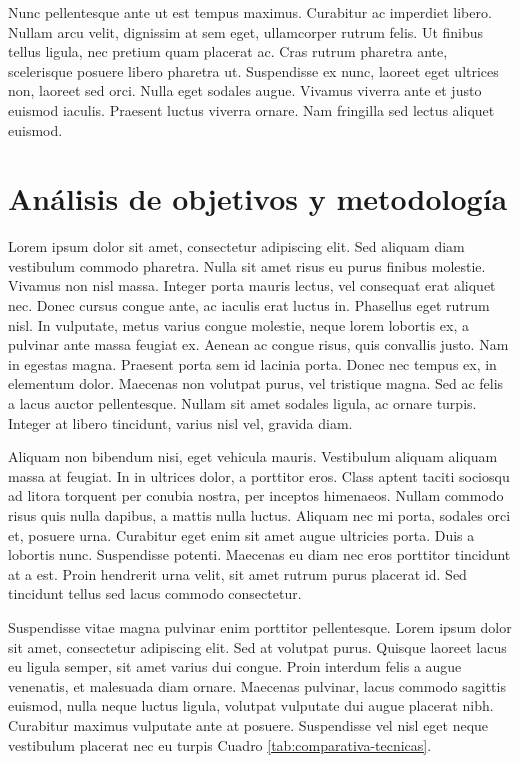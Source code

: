 Nunc pellentesque ante ut est tempus maximus. Curabitur ac imperdiet libero. Nullam arcu velit, dignissim at sem eget, ullamcorper rutrum felis. Ut finibus tellus ligula, nec pretium quam placerat ac. Cras rutrum pharetra ante, scelerisque posuere libero pharetra ut. Suspendisse ex nunc, laoreet eget ultrices non, laoreet sed orci. Nulla eget sodales augue. Vivamus viverra ante et justo euismod iaculis. Praesent luctus viverra ornare. Nam fringilla sed lectus aliquet euismod.


\chapter{Análisis de objetivos y metodología}

Lorem ipsum dolor sit amet, consectetur adipiscing elit. Sed aliquam diam vestibulum commodo pharetra. Nulla sit amet risus eu purus finibus molestie. Vivamus non nisl massa. Integer porta mauris lectus, vel consequat erat aliquet nec. Donec cursus congue ante, ac iaculis erat luctus in. Phasellus eget rutrum nisl. In vulputate, metus varius congue molestie, neque lorem lobortis ex, a pulvinar ante massa feugiat ex. Aenean ac congue risus, quis convallis justo. Nam in egestas magna. Praesent porta sem id lacinia porta. Donec nec tempus ex, in elementum dolor. Maecenas non volutpat purus, vel tristique magna. Sed ac felis a lacus auctor pellentesque. Nullam sit amet sodales ligula, ac ornare turpis. Integer at libero tincidunt, varius nisl vel, gravida diam.

Aliquam non bibendum nisi, eget vehicula mauris. Vestibulum aliquam aliquam massa at feugiat. In in ultrices dolor, a porttitor eros. Class aptent taciti sociosqu ad litora torquent per conubia nostra, per inceptos himenaeos. Nullam commodo risus quis nulla dapibus, a mattis nulla luctus. Aliquam nec mi porta, sodales orci et, posuere urna. Curabitur eget enim sit amet augue ultricies porta. Duis a lobortis nunc. Suspendisse potenti. Maecenas eu diam nec eros porttitor tincidunt at a est. Proin hendrerit urna velit, sit amet rutrum purus placerat id. Sed tincidunt tellus sed lacus commodo consectetur.

Suspendisse vitae magna pulvinar enim porttitor pellentesque. Lorem ipsum dolor sit amet, consectetur adipiscing elit. Sed at volutpat purus. Quisque laoreet lacus eu ligula semper, sit amet varius dui congue. Proin interdum felis a augue venenatis, et malesuada diam ornare. Maecenas pulvinar, lacus commodo sagittis euismod, nulla neque luctus ligula, volutpat vulputate dui augue placerat nibh. Curabitur maximus vulputate ante at posuere. Suspendisse vel nisl eget neque vestibulum placerat nec eu turpis Cuadro \ref{tab:comparativa-tecnicas}.

